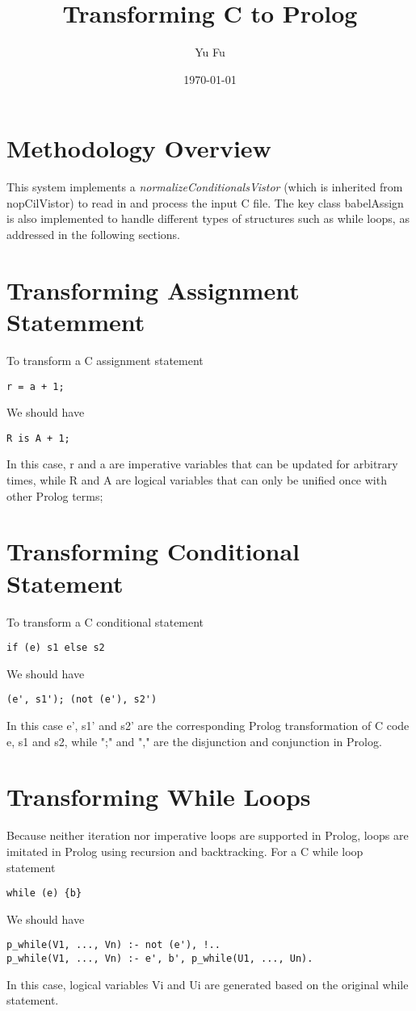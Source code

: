 \documentclass[11pt]{article}
\begin{document}
\title{Transforming C to Prolog}
\author{Yu Fu}
\date{\today}
\maketitle

\section{Methodology Overview}
This system implements a \emph{normalizeConditionalsVistor} (which is inherited from nopCilVistor) to read in and process the input C file. The key class babelAssign is also implemented to handle different types of structures such as while loops, as addressed in the following sections.

\section{Transforming Assignment Statemment}
To transform a C assignment statement 
\begin{lstlisting}[mathescape]
r = a + 1;	
\end{lstlisting}
We should have 
\begin{lstlisting}[mathescape]
R is A + 1;	
\end{lstlisting}
In this case, r and a are imperative variables that can be updated for arbitrary times, while R and A are logical variables that can only be unified once with other Prolog terms;

\section{Transforming Conditional Statement}
To transform a C conditional statement
\begin{lstlisting}[mathescape]
if (e) s1 else s2
\end{lstlisting}
We should have 
\begin{lstlisting}[mathescape]
(e', s1'); (not (e'), s2')	
\end{lstlisting}
In this case e', s1' and s2' are the corresponding Prolog transformation of C code e, s1 and s2, while ";" and "," are the disjunction and conjunction in Prolog.

\section{Transforming While Loops}
Because neither iteration nor imperative loops are supported in Prolog, loops are imitated in Prolog using recursion and backtracking. For a C while loop statement
\begin{lstlisting}[mathescape]
while (e) {b}	
\end{lstlisting}
We should have 
\begin{lstlisting}[mathescape]
p_while(V1, ..., Vn) :- not (e'), !..
p_while(V1, ..., Vn) :- e', b', p_while(U1, ..., Un).
\end{lstlisting}
In this case, logical variables Vi and Ui are generated based on the original while statement.
\end{document}
